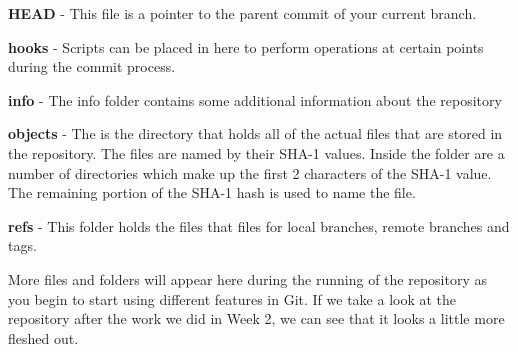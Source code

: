 \textbf{HEAD} - This file is a pointer to the parent commit of your current branch.

\textbf{hooks} - Scripts can be placed in here to perform operations at certain points during the commit process.

\textbf{info} - The info folder contains some additional information about the repository

\textbf{objects} - The is the directory that holds all of the actual files that are stored in the repository.  The files are named by their SHA-1 values.  Inside the folder are a number of directories which make up the first 2 characters of the SHA-1 value.  The remaining portion of the SHA-1 hash is used to name the file.

\textbf{refs} - This folder holds the files that files for local branches, remote branches and tags.

More files and folders will appear here during the running of the repository as you begin to start using different features in Git.  If we take a look at the repository after the work we did in Week 2, we can see that it looks a little more fleshed out.
